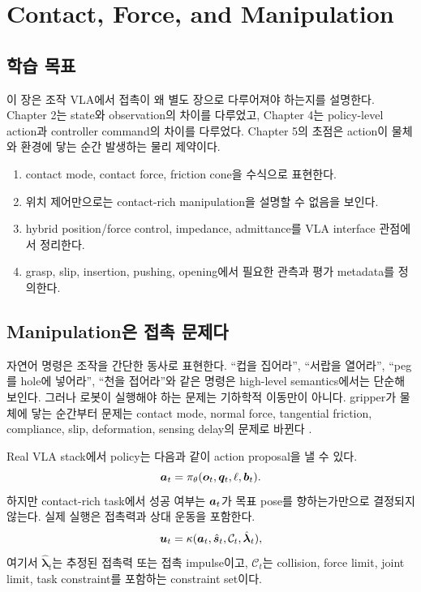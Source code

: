 \chapter{Contact, Force, and Manipulation}

\section*{학습 목표}

이 장은 조작 VLA에서 접촉이 왜 별도 장으로 다루어져야 하는지를 설명한다. Chapter 2는 state와 observation의 차이를 다루었고, Chapter 4는 policy-level action과 controller command의 차이를 다루었다. Chapter 5의 초점은 action이 물체와 환경에 닿는 순간 발생하는 물리 제약이다.

\begin{enumerate}
  \item contact mode, contact force, friction cone을 수식으로 표현한다.
  \item 위치 제어만으로는 contact-rich manipulation을 설명할 수 없음을 보인다.
  \item hybrid position/force control, impedance, admittance를 VLA interface 관점에서 정리한다.
  \item grasp, slip, insertion, pushing, opening에서 필요한 관측과 평가 metadata를 정의한다.
\end{enumerate}

\section{Manipulation은 접촉 문제다}

자연어 명령은 조작을 간단한 동사로 표현한다. ``컵을 집어라'', ``서랍을 열어라'', ``peg를 hole에 넣어라'', ``천을 접어라''와 같은 명령은 high-level semantics에서는 단순해 보인다. 그러나 로봇이 실행해야 하는 문제는 기하학적 이동만이 아니다. gripper가 물체에 닿는 순간부터 문제는 contact mode, normal force, tangential friction, compliance, slip, deformation, sensing delay의 문제로 바뀐다 \cite{mason2001,hogan1985}.

Real VLA stack에서 policy는 다음과 같이 action proposal을 낼 수 있다.
\begin{equation}
  \bm{a}_t = \pi_\theta(\bm{o}_t,\bm{q}_t,\ell,\bm{b}_t).
  \label{eq:ch4-policy}
\end{equation}
하지만 contact-rich task에서 성공 여부는 $\bm{a}_t$가 목표 pose를 향하는가만으로 결정되지 않는다. 실제 실행은 접촉력과 상대 운동을 포함한다.
\begin{equation}
  \bm{u}_t
  =
  \kappa(\bm{a}_t,\hat{\bm{s}}_t,\mathcal{C}_t,\hat{\bm{\lambda}}_t),
  \label{eq:ch4-controller-contact}
\end{equation}
여기서 $\hat{\bm{\lambda}}_t$는 추정된 접촉력 또는 접촉 impulse이고, $\mathcal{C}_t$는 collision, force limit, joint limit, task constraint를 포함하는 constraint set이다.

